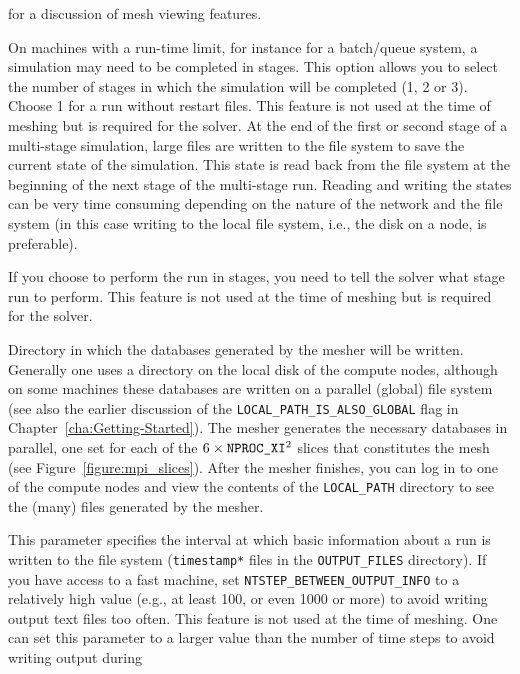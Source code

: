 \begin{description}
for a discussion of mesh viewing features.
%
\item [{\texttt{NUMBER\_OF\_RUNS}}] On machines with a run-time limit,
for instance for a batch/queue system, a simulation may need to be
completed in stages. This option allows you to select the number of
stages in which the simulation will be completed (1, 2 or 3). Choose
1 for a run without restart files. This feature is not used at the
time of meshing but is required for the solver. At the end of the
first or second stage of a multi-stage simulation, large files are
written to the file system to save the current state of the simulation.
This state is read back from the file system at the beginning of the
next stage of the multi-stage run. Reading and writing the states
can be very time consuming depending on the nature of the network
and the file system (in this case writing to the local file system,
i.e., the disk on a node, is preferable).
%
\item [{\texttt{NUMBER\_OF\_THIS\_RUN}}] If you choose to perform the run
in stages, you need to tell the solver what stage run to perform.
This feature is not used at the time of meshing but is required for
the solver.
%
\item [{\texttt{LOCAL\_PATH}}] Directory in which the databases generated
by the mesher will be written. Generally one uses a directory on the
local disk of the compute nodes, although on some machines these databases
are written on a parallel (global) file system (see also the earlier
discussion of the \texttt{LOCAL\_PATH\_IS\_ALSO\_GLOBAL} flag in Chapter~\ref{cha:Getting-Started}).
The mesher generates the necessary databases in parallel, one set
for each of the $6\times\mbox{\texttt{NPROC\_XI}}^{2}$ slices that constitutes the
mesh (see Figure~\ref{figure:mpi_slices}). After the mesher finishes,
you can log in to one of the compute nodes and view the contents of
the \texttt{LOCAL\_PATH} directory to see the (many) files generated
by the mesher.
%
\item [{\texttt{NTSTEP\_BETWEEN\_OUTPUT\_INFO}}] This parameter specifies
the interval at which basic information about a run is written to
the file system (\texttt{timestamp{*}} files in the \texttt{OUTPUT\_FILES}
directory). If you have access to a fast machine, set \texttt{NTSTEP\_BETWEEN\_OUTPUT\_INFO}
to a relatively high value (e.g., at least 100, or even 1000 or more)
to avoid writing output text files too often. This feature is not
used at the time of meshing. One can set this parameter to a larger
value than the number of time steps to avoid writing output during

\end{description}

